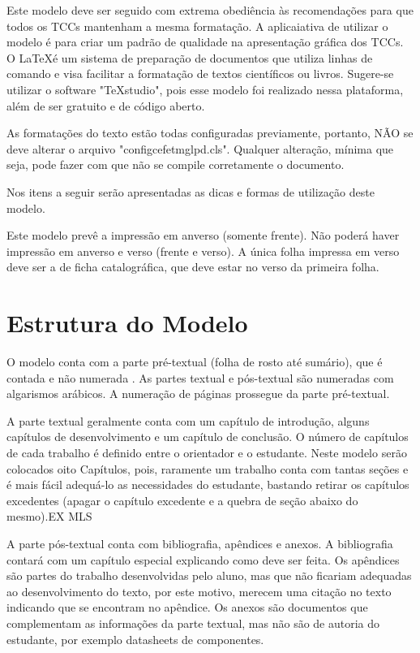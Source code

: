 \documentclass[
        oneside,      %
        english,			
        brazil			 
        ]{configcefetmglpd}
\begin{document}
Este modelo deve ser seguido com extrema obediência às recomendações para que todos os TCCs mantenham a mesma formatação. A aplicaiativa de utilizar o modelo é para criar um padrão de qualidade na apresentação gráfica dos TCCs. O \LaTeX é um sistema de preparação de documentos que utiliza linhas de comando e visa facilitar a formatação de textos científicos ou livros. Sugere-se utilizar o software "TeXstudio", pois esse modelo foi realizado nessa plataforma, além de ser gratuito e de código aberto. %

As formatações do texto estão todas configuradas previamente, portanto, NÃO se deve alterar o arquivo "configcefetmglpd.cls". Qualquer alteração, mínima que seja, pode fazer com que não se compile corretamente o documento.

Nos itens a seguir serão apresentadas as dicas e formas de utilização deste modelo.

Este modelo prevê a impressão em anverso (somente frente). Não poderá haver impressão em anverso e verso (frente e verso). A única folha impressa em verso deve ser a de ficha catalográfica, que deve estar no verso da primeira folha.


\section{Estrutura do Modelo} %
\label{sec:estrutura_modelo}  %
O modelo conta com a parte pré-textual (folha de rosto até sumário), que é contada e não numerada \cite{bib:abnt6027}. As partes textual e pós-textual são numeradas com algarismos arábicos. A numeração de páginas prossegue da parte pré-textual.

A parte textual geralmente conta com um capítulo de introdução, alguns capítulos de desenvolvimento e um capítulo de conclusão. O número de capítulos de cada trabalho é definido entre o orientador e o estudante. Neste modelo serão colocados oito Capítulos, pois, raramente um trabalho conta com tantas seções e é mais fácil adequá-lo as necessidades do estudante, bastando retirar os capítulos excedentes (apagar o capítulo excedente e a quebra de seção abaixo do mesmo).\ac{EX} \ac{MLS}

A parte pós-textual conta com bibliografia, apêndices e anexos. A bibliografia contará com um capítulo especial explicando como deve ser feita. Os apêndices são partes do trabalho desenvolvidas pelo aluno, mas que não ficariam adequadas ao desenvolvimento do texto, por este motivo, merecem uma citação no texto indicando que se encontram no apêndice. Os anexos são documentos que complementam as informações da parte textual, mas não são de autoria do estudante, por exemplo datasheets de componentes.
\end{document}
